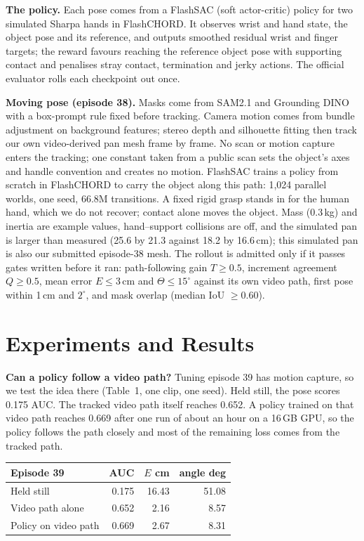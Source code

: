 \documentclass[10pt, logo, copyright, anonymous]{nvidiaextabstract}
\begin{document}
\textbf{The policy.} Each pose comes from a FlashSAC (soft actor-critic)
policy for two simulated Sharpa hands in FlashCHORD. It observes wrist and
hand state, the object pose and its reference, and outputs smoothed residual
wrist and finger targets; the reward favours reaching the reference object
pose with supporting contact and penalises stray contact, termination and
jerky actions. The official evaluator rolls each checkpoint out once.

\textbf{Moving pose (episode 38).} Masks come from SAM2.1 and Grounding
DINO with a box-prompt rule fixed before tracking. Camera motion comes from
bundle adjustment on background features; stereo depth and silhouette
fitting then track our own video-derived pan mesh frame by frame. No scan
or motion capture enters the tracking; one constant taken from a public
scan sets the object's axes and handle convention and creates no motion.
FlashSAC trains a policy from scratch in FlashCHORD to carry the object
along this path: 1,024 parallel worlds, one seed, 66.8M transitions. A fixed
rigid grasp stands in for the human hand, which we do not recover; contact
alone moves the object. Mass (0.3\,kg) and inertia are example values,
hand--support collisions are off, and the simulated pan is larger than
measured (25.6 by 21.3 against 18.2 by 16.6\,cm); this simulated pan is also
our submitted episode-38 mesh. The rollout is admitted only if it passes gates written before it
ran: path-following gain $T\geq0.5$, increment agreement $Q\geq0.5$, mean
error $E\leq3$\,cm and $\Theta\leq15^\circ$ against its own video path,
first pose within 1\,cm and $2^\circ$, and mask overlap (median IoU
$\geq0.60$).

\section{Experiments and Results}
\textbf{Can a policy follow a video path?} Tuning episode 39 has motion
capture, so we test the idea there (Table~1, one clip, one seed). Held
still, the pose scores 0.175 AUC. The tracked video path itself reaches
0.652. A policy trained on that video path reaches 0.669 after one run of
about an hour on a 16\,GB GPU, so the policy follows the path closely and
most of the remaining loss comes from the tracked path.

\noindent\begin{minipage}{\columnwidth}
\centering\small
\setlength{\tabcolsep}{3pt}
\begin{tabular}{lrrr}
\toprule
Episode 39 & AUC & $E$ cm & angle deg \\
\midrule
Held still & 0.175 & 16.43 & 51.08 \\
Video path alone & 0.652 & 2.16 & 8.57 \\
Policy on video path & 0.669 & 2.67 & 8.31 \\
\bottomrule
\end{tabular}
\end{minipage}\par
\end{document}
